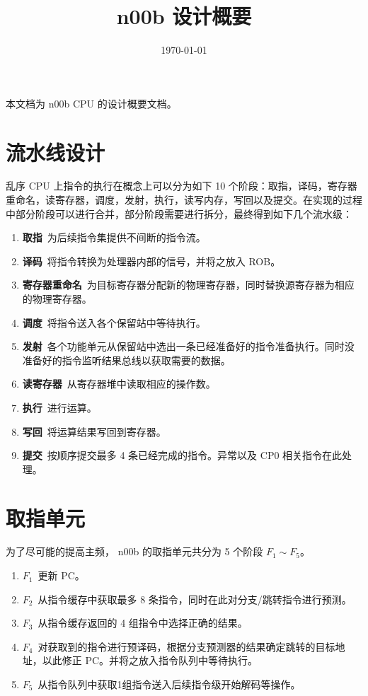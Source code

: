 \documentclass[blue,normal,cn]{elegantnote}
\title{n00b 设计概要}
\date{\today}
\begin{document}
\maketitle
	
本文档为 n00b CPU 的设计概要文档。

\section{流水线设计}

乱序 CPU 上指令的执行在概念上可以分为如下 10 个阶段：取指，译码，寄存器重命名，读寄存器，调度，发射，执行，读写内存，写回以及提交。在实现的过程中部分阶段可以进行合并，部分阶段需要进行拆分，最终得到如下几个流水级：
\begin{enumerate}
	\item \textbf{取指}\ 为后续指令集提供不间断的指令流。
	\item \textbf{译码}\ 将指令转换为处理器内部的信号，并将之放入 ROB。
	\item \textbf{寄存器重命名}\ 为目标寄存器分配新的物理寄存器，同时替换源寄存器为相应的物理寄存器。
	\item \textbf{调度}\ 将指令送入各个保留站中等待执行。
	\item \textbf{发射}\ 各个功能单元从保留站中选出一条已经准备好的指令准备执行。同时没准备好的指令监听结果总线以获取需要的数据。
	\item \textbf{读寄存器}\ 从寄存器堆中读取相应的操作数。
	\item \textbf{执行}\ 进行运算。
	\item \textbf{写回}\ 将运算结果写回到寄存器。
	\item \textbf{提交}\ 按顺序提交最多 4 条已经完成的指令。异常以及 CP0 相关指令在此处理。
\end{enumerate}

\section{取指单元}
为了尽可能的提高主频， n00b 的取指单元共分为 5 个阶段 $F_1 \sim F_5$。

\begin{enumerate}
	\item \textbf{$F_1$}\ 更新 PC。
	\item \textbf{$F_2$}\ 从指令缓存中获取最多 8 条指令，同时在此对分支/跳转指令进行预测。
	\item \textbf{$F_3$}\ 从指令缓存返回的 4 组指令中选择正确的结果。
	\item \textbf{$F_4$}\ 对获取到的指令进行预译码，根据分支预测器的结果确定跳转的目标地址，以此修正 PC。并将之放入指令队列中等待执行。
	\item \textbf{$F_5$}\ 从指令队列中获取1组指令送入后续指令级开始解码等操作。
\end{enumerate}
\end{document}
